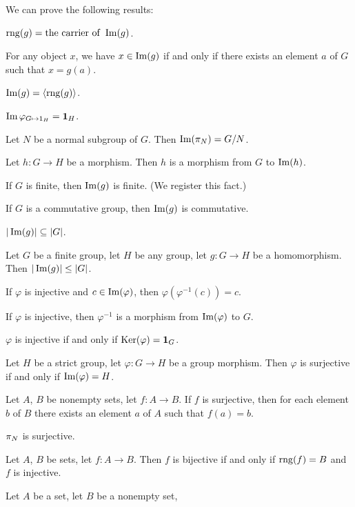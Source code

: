 \documentclass{article}
\begin{document}
We can prove the following results:
\begin{thm}
\item\label{group6:44} $\operatorname{rng}(g)=\operatorname{the\ carrier\ of\ }\operatorname{Im}(g)$.
\item\label{group6:45} For any object $x$, we have $x\in\operatorname{Im}(g)$ if
  and only if there exists an element $a$ of $G$ such that $x=g(a)$.
\item\label{group6:46} $\operatorname{Im}(g)=\langle\operatorname{rng}(g)\rangle$.
\item\label{group6:47} $\operatorname{Im}{\varphi_{G\mapsto 1_{H}}}=\mathbf{1}_{H}$.
\item\label{group6:48} Let $N$ be a normal subgroup of $G$. Then $\operatorname{Im}(\pi_{N})=G/N$.
\item\label{group6:49} Let $h\colon G\to H$ be a morphism. Then $h$ is a
  morphism from $G$ to $\operatorname{Im}(h)$.
\item\label{group6:50} If $G$ is finite, then $\operatorname{Im}(g)$ is finite. (We
  register this fact.)
\item\label{group6:51} If $G$ is a commutative group, then $\operatorname{Im}(g)$
  is commutative. 
\item\label{group6:52} $|\operatorname{Im}(g)|\subseteq|G|$. 
\item\label{group6:53} Let $G$ be a finite group, let $H$ be any group,
  let $g\colon G\to H$ be a homomorphism. Then $|\operatorname{Im}(g)|\leq|G|$.
\item\label{group6:54} If $\varphi$ is injective and
  $c\in\operatorname{Im}(\varphi)$,
  then $\varphi(\varphi^{-1}(c))=c$.
\item\label{group6:55} If $\varphi$ is injective, then $\varphi^{-1}$ is
  a morphism from $\operatorname{Im}(\varphi)$ to $G$.
\item\label{group6:56} $\varphi$ is injective if and only if $\operatorname{Ker}(\varphi)=\mathbf{1}_{G}$.
\item\label{group6:57} Let $H$ be a strict group, let $\varphi\colon G\to H$
  be a group morphism. Then $\varphi$ is surjective if and only if $\operatorname{Im}(\varphi)=H$.
\item\label{group6:58} Let $A$, $B$ be nonempty sets, let $f\colon A\to B$.
  If $f$ is surjective, then for each element $b$ of $B$ there exists an
  element $a$ of $A$ such that $f(a)=b$.
\item\label{group6:59} $\pi_{N}$ is surjective.
\item\label{group6:60} Let $A$, $B$ be sets, let $f\colon A\to B$.
  Then $f$ is bijective if and only if $\operatorname{rng}(f)=B$ and $f$ is injective.
\item\label{group6:61} Let $A$ be a set, let $B$ be a nonempty set,

\end{thm}
\end{document}
